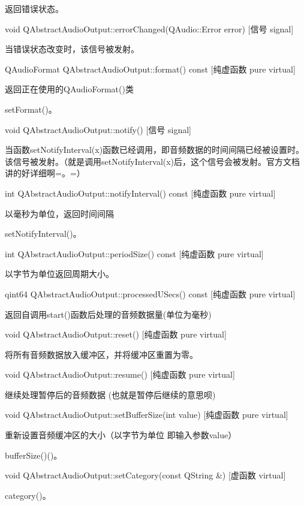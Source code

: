 返回错误状态。

void QAbstractAudioOutput::errorChanged(QAudio::Error error) [信号 signal] 

当错误状态改变时，该信号被发射。

QAudioFormat QAbstractAudioOutput::format() const [纯虚函数 pure virtual]

返回正在使用的QAudioFormat()类 

\begin{seeAlso}
setFormat()。
\end{seeAlso}

void QAbstractAudioOutput::notify() [信号 signal] 

当函数setNotifyInterval(x)函数已经调用，即音频数据的时间间隔已经被设置时。该信号被发射。（就是调用setNotifyInterval(x)后，这个信号会被发射。官方文档讲的好详细啊=。=）

int QAbstractAudioOutput::notifyInterval() const [纯虚函数 pure virtual]

以毫秒为单位，返回时间间隔 

\begin{seeAlso}
setNotifyInterval()。
\end{seeAlso}

int QAbstractAudioOutput::periodSize() const [纯虚函数 pure virtual] 

以字节为单位返回周期大小。

qint64 QAbstractAudioOutput::processedUSecs() const [纯虚函数 pure
virtual] 

返回自调用start()函数后处理的音频数据量(单位为毫秒)

void QAbstractAudioOutput::reset() [纯虚函数 pure virtual] 

将所有音频数据放入缓冲区，并将缓冲区重置为零。

void QAbstractAudioOutput::resume() [纯虚函数 pure virtual] 

继续处理暂停后的音频数据 (也就是暂停后继续的意思呗)

void QAbstractAudioOutput::setBufferSize(int value) [纯虚函数 pure virtual]

重新设置音频缓冲区的大小（以字节为单位 即输入参数value） 

\begin{seeAlso}
bufferSize()()。
\end{seeAlso}

void QAbstractAudioOutput::setCategory(const QString \&) [虚函数 virtual] 

\begin{seeAlso}
category()。
\end{seeAlso}

